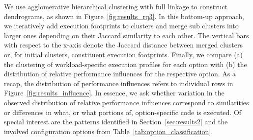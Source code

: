 We use agglomerative hierarchical clustering with full linkage to construct dendrograms, as shown in Figure~\ref{fig:results_rq3}. In this bottom-up approach, we iteratively add execution footprints to clusters and merge sub clusters into larger ones depending on their Jaccard similarity  to each other. The vertical bars with respect to the x-axis denote the Jaccard distance between merged clusters or, for initial clusters, constituent execution footprints. Finally, we compare (a) the clustering of workload-specific execution profiles for each option with (b) the distribution of relative performance influences for the respective option. As a recap, the distribution of performance influences refers to individual rows in Figure~\ref{fig:results_influence}. In essence, we ask whether variation in the observed distribution of relative performance influences correspond to similarities or differences in what, or what portions of, option-specific code is executed. Of special interest are the patterns identified in Section~\ref{sec:results2} and the involved configuration options from Table~\ref{tab:option_classification}.

